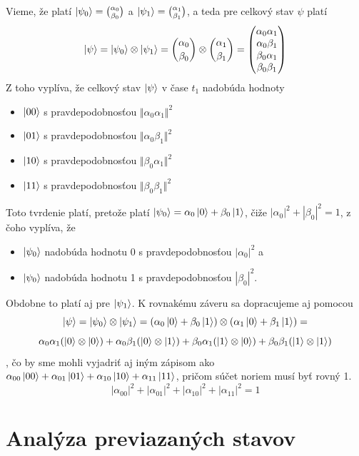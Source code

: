 Vieme, že platí \(\ket{\psi_0} = \binom{\alpha_0}{\beta_0}\) a  
\(\ket{\psi_1} = \binom{\alpha_1}{\beta_1}\), a teda pre celkový stav \(\psi\) 
platí 
\[
\ket{\psi} = \ket{\psi_0} \otimes \ket{\psi_1} = \binom{\alpha_0}{\beta_0}
\otimes \binom{\alpha_1}{\beta_1} = 
\begin{pmatrix}
    \alpha_0\alpha_1 \\
    \alpha_0\beta_1 \\
    \beta_0\alpha_1 \\
    \beta_0\beta_1
\end{pmatrix}
\]
Z toho vyplíva, že celkový stav \(\ket{\psi}\) v čase \(t_1\) nadobúda 
hodnoty
\begin{itemize}
    \item[] \(\ket{00}\) s pravdepodobnosťou \(\Vert \alpha_0\alpha_1 \Vert^2\)
    \item[] \(\ket{01}\) s pravdepodobnosťou \(\Vert \alpha_0\beta_1 \Vert^2\)
    \item[] \(\ket{10}\) s pravdepodobnosťou \(\Vert \beta_0\alpha_1 \Vert^2\)
    \item[] \(\ket{11}\) s pravdepodobnosťou \(\Vert \beta_0\beta_1 \Vert^2\)
\end{itemize}

Toto tvrdenie platí, pretože platí 
\(\ket{\psi_0} = \alpha_0\ket{0} + \beta_0\ket{1}\), čiže 
\(|\alpha_0|^2 + |\beta_0|^2 = 1\), z čoho vyplíva, že 
\begin{itemize}
    \item[] \(\ket{\psi_0}\) nadobúda hodnotu 0 s 
pravdepodobnosťou \(|\alpha_0|^2\) a 
    \item[] \(\ket{\psi_0}\) nadobúda hodnotu 1 s 
pravdepodobnosťou \(|\beta_0|^2\).
\end{itemize}
Obdobne to platí aj pre \(\ket{\psi_1}\). K rovnakému záveru sa dopracujeme
aj pomocou 
\[\ket{\psi} = \ket{\psi_0} \otimes \ket{\psi_1} = 
(\alpha_0\ket{0} + \beta_0\ket{1}) \otimes  (\alpha_1\ket{0} + \beta_1\ket{1}) =
\]
\[
\alpha_0\alpha_1 (\ket{0} \otimes \ket{0}) +  
\alpha_0\beta_1 (\ket{0} \otimes \ket{1}) + 
\beta_0\alpha_1 (\ket{1} \otimes \ket{0}) + 
\beta_0\beta_1 (\ket{1} \otimes \ket{1}) 
\]
, čo by sme mohli vyjadriť aj iným zápisom ako 
\(
\alpha_{00}\ket{00} + \alpha_{01}\ket{01} + 
\alpha_{10}\ket{10} + \alpha_{11}\ket{11}
\), pričom súčet noriem musí byť rovný 1.
\[
|\alpha_{00}|^2 + |\alpha_{01}|^2 + |\alpha_{10}|^2 + |\alpha_{11}|^2 = 1\]

\section{Analýza previazaných stavov}

